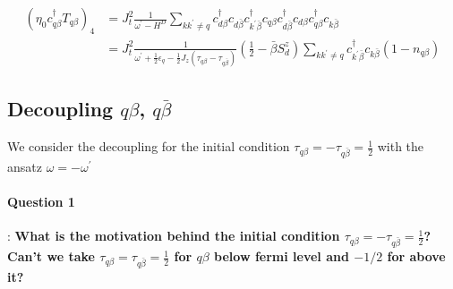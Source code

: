 \documentclass[14pt]{extarticle}
\newcommand{\qs}[1]{\textbf{{\textcolor{botgreen}{#1}}}}
\numberwithin{equation}{section}
\begin{document}
\begin{subequations}
\begin{align}
     \left( \eta_0 c^{\dag}_{q\beta}T_{q \beta} \right)_4  &= J_t^2 \frac{1}{\omega^{\prime} - H^D} \sum\limits_{kk^{\prime}\ne q}  c^{\dag}_{d\beta} c_{d\bar{\beta}}  c^{\dag}_{k^{\prime}\bar{\beta}}c_{q\beta}  c^{\dag}_{d\bar{\beta}} c_{d\beta} c^{\dag}_{q\beta}c_{k\bar{\beta}} \nonumber\\
                                        &= J_t^2 \frac{1}{\omega^{\prime} + \frac{1}{2}\epsilon_q - \frac{1}{2} J_z \left( \tau_{q\beta} - \tau_{q\bar{\beta}} \right)} \left( \frac{1}{2} - \bar{\beta} S_d^z \right) \sum\limits_{kk^{\prime}\ne q} c^{\dag}_{k^{\prime}\bar{\beta}} c_{k\bar{\beta}} \left( 1 - n_{q\beta} \right) \label{eq:30} 
\end{align}
\end{subequations}

\subsection{Decoupling $q\beta$, $q\bar{\beta}$}
We consider the decoupling for the initial condition $\tau_{q\beta} = - \tau_{q\bar{\beta}} = \frac{1}{2}$ with the ansatz $\omega = -\omega^{\prime}$

\paragraph{Question 1}: \hypertarget{q1}{\qs{ What is the motivation behind the initial condition $\tau_{q\beta} = - \tau_{q\bar{\beta}} = \frac{1}{2}$? Can't we take $\tau_{q\beta} =  \tau_{q\bar{\beta}} = \frac{1}{2}$ for $q\beta$ below fermi level and $-1/2$ for above it?}}
\end{document}
